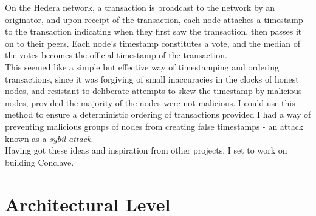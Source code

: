 \documentclass{report}
\begin{document}
	On the Hedera network, a transaction is broadcast to the network by an originator, and upon receipt of the transaction, each node attaches a timestamp  to the transaction indicating when they first saw the transaction, then passes it on to their peers. Each node's timestamp constitutes a vote,  and the median of the votes becomes the official timestamp of the transaction. \\
	
	This seemed like a simple but effective way of timestamping and ordering transactions, since it was forgiving of small inaccuracies in the clocks of honest nodes, and resistant to deliberate attempts to skew the timestamp by malicious nodes, provided the majority of the nodes were not malicious. I could use this method to ensure a deterministic ordering of transactions provided I had a way of preventing malicious groups of nodes from creating false timestamps - an attack known as a \textit{sybil attack}.  \\
	
	Having got these ideas and inspiration from other projects, I set to work on building Conclave.
	
	\section{Architectural Level}
\end{document}
